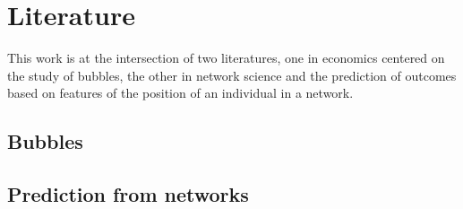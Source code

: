 \section{Literature}

This work is at the intersection of two literatures, one in economics centered on the study of bubbles, the other in network science and the prediction of outcomes based on features of the position of an individual in a network.

\subsection{Bubbles}

\subsection{Prediction from networks}
